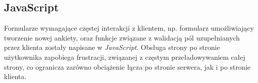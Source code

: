 \subsection{JavaScript}
\label{Chapter635}

Formularze wymagające częstej interakcji z klientem, np. formularz umożliwiający tworzenie nowej ankiety, oraz funkcje związane z walidacją pól uzupełnianych przez klienta zostały napisane w \emph{JavaScript}. Obsługa strony po stronie użytkownika zapobiega frustracji, związanej z częstym przeładowywaniem całej strony, co ogranicza zarówno obciążenie łącza po stronie serwera, jak i po stronie klienta.